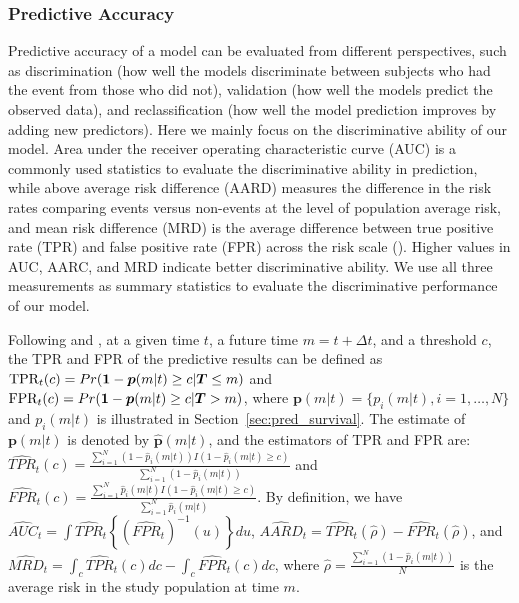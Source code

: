 \subsubsection{Predictive Accuracy} \label{sec:pred_accuracy}
Predictive accuracy of a model can be evaluated from different perspectives, such as discrimination (how well the models discriminate between subjects who had the event from those who did not), validation (how well the models predict the observed data), and reclassification (how well the model prediction improves by adding new predictors). Here we mainly focus on the discriminative ability of our model. Area under the receiver operating characteristic curve (AUC) is a commonly used statistics to evaluate the discriminative ability in prediction, while above average risk difference (AARD) measures the difference in the risk rates comparing events versus non-events at the level of population average risk, and mean risk difference (MRD) is the average difference between true positive rate (TPR) and false positive rate (FPR) across the risk scale (\citealp{pepe2008comments}). Higher values in AUC, AARC, and MRD indicate better discriminative ability. We use all three measurements as summary statistics to evaluate the discriminative performance of our model.

Following \citet{zheng2013adopting} and \citet{yang2015prediction}, at a given time $t$, a future time $ m = t+\Delta t$, and a threshold $c$, the TPR and FPR of the predictive results can be defined as $\mbox{TPR}_t(c)=Pr({\bf 1}-\boldsymbol{p}(m|t)\ge c | \boldsymbol{T}\le m)$ and $\mbox{FPR}_t(c)=Pr({\bf 1}-\boldsymbol{p}(m|t)\ge c | \boldsymbol{T} > m)$, where $\boldsymbol{p}(m|t)=\{p_i(m|t), i=1, \ldots, N\}$ and $p_i(m|t)$ is illustrated in Section~\ref{sec:pred_survival}. The estimate of $\boldsymbol{p}(m | t)$ is denoted by $\hat{\boldsymbol{p}}(m | t)$, and the estimators of TPR and FPR are: $\widehat{TPR}_{t}(c) = \frac{\sum_{i=1}^{N}(1-\hat{p}_i(m|t))I(1-\hat{p}_i(m|t)\ge c)}{\sum_{i=1}^{N}(1-\hat{p}_i(m|t))}$ and $\widehat{FPR}_{t}(c) = \frac{\sum_{i=1}^{N}\hat{p}_i(m|t)I(1-\hat{p}_i(m|t)\ge c)}{\sum_{i=1}^{N}\hat{p}_i(m|t)}$. By definition, we have $\widehat{AUC}_t = \int \widehat{TPR}_t\left\{ (\widehat{FPR}_t)^{-1}(u)\right\}du$, $\widehat{AARD}_t = \widehat{TPR}_t(\hat{\rho}) - \widehat{FPR}_t(\hat{\rho})$, and $\widehat{MRD}_t = \int_c \widehat{TPR}_t(c)dc - \int_c \widehat{FPR}_t(c)dc$, where $\hat{\rho} = \frac{\sum_{i=1}^N (1-\hat{p}_i(m| t))}{N}$ is the average risk in the study population at time $m$.





%
%
% 


% 